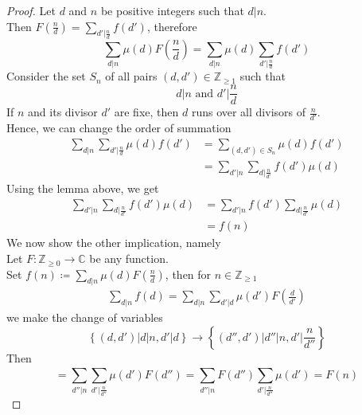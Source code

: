 \documentclass[../main.tex]{subfiles}
\begin{document}
\begin{proof}
Let $d $ and $n$ be positive integers such that $d|n $.\\
Then $F( \frac{n}{d}) = \sum_{d'| \frac{n}{d}} f( d') $, therefore
\[ 
	\sum_{d|n} \mu( d) F( \frac{n}{d})  = \sum_{d|n} \mu( d)  \sum_{d'| \frac{n}{d}} f( d') 
\]
Consider the set $S_n$ of all pairs $( d,d') \in \mathbb{Z}_{\geq 1} $ such that 
\[ 
d|n \text{ and } d' | \frac{n}{d}
\]
If $n$ and its divisor $d'$ are fixe, then $d$ runs over all divisors of $\frac{n}{d'}$.\\
Hence, we can change the order of summation
\begin{align*}
	\sum_{d|n} \sum_{d' | \frac{n}{d}} \mu( d)  f( d') &= \sum_{( d,d') \in S_n} \mu( d) f( d')\\
	&= \sum_{d'|n} \sum_{d| \frac{n}{d'}} f( d' )  \mu( d)
\end{align*}
Using the lemma above, we get
\begin{align*}
	\sum_{d'|n} \sum_{d| \frac{n}{d'}} f( d' )  \mu( d) &= \sum_{d'|n} f( d') \sum_{d| \frac{n}{d'}} \mu( d) \\
	&=f( n) 
\end{align*}
We now show the other implication, namely\\
Let $F: \mathbb{Z}_{\geq 0} \to \mathbb{C} $ be any function.\\
Set $f( n) \coloneqq \sum_{d|n} \mu(d) F( \frac{n}{d}) $, then for $n \in \mathbb{Z}_{\geq 1} $ 
\begin{align*}
	\sum_{d|n} f( d) = \sum_{d|n} \sum_{d'|d} \mu( d') F( \frac{d}{d'}) 
\end{align*}
we make the change of variables
\[ 
	\left\{ ( d,d') | d|n, d'|d \right\} \to \left\{ ( d'',d') | d'' |n, d' |\frac{n}{d''} \right\} 
\]
Then
\[ 
	= \sum_{d''|n} \sum_{d'| \frac{n}{d''}} \mu( d') F( d'') = \sum_{d''|n}^{ } F( d'') \sum_{d'| \frac{n}{d''}}^{ }\mu( d') = F( n) 
\]
\end{proof}
\end{document}
